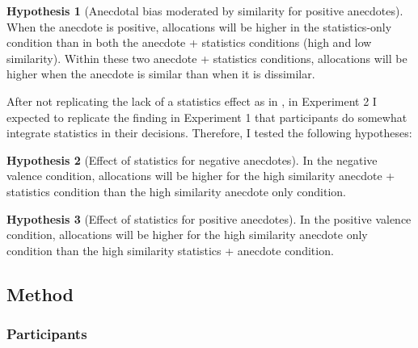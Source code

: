 \documentclass[a4paper, nobind, dvipsnames]{templates/ociamthesis}
\theoremstyle{definition}
\theoremstyle{definition}
\theoremstyle{definition}
\theoremstyle{definition}
\newtheorem{hypothesis}{Hypothesis}[chapter]
\theoremstyle{remark}
\begin{document}
\begin{hypothesis}[Anecdotal bias moderated by similarity for positive anecdotes]
\protect\hypertarget{hyp:anecdote-similarity-anecdotes-2}{}{\label{hyp:anecdote-similarity-anecdotes-2} {} }When the anecdote is positive, allocations will be higher in the statistics-only
condition than in both the anecdote + statistics conditions (high and low
similarity). Within these two anecdote + statistics conditions, allocations will
be higher when the anecdote is similar than when it is dissimilar.
\end{hypothesis}

After not replicating the lack of a statistics effect as in \textcite{wainberg2013}, in
Experiment 2 I expected to replicate the finding in Experiment 1 that
participants do somewhat integrate statistics in their decisions. Therefore, I
tested the following hypotheses:

\begin{hypothesis}[Effect of statistics for negative anecdotes]
\protect\hypertarget{hyp:statistics-negative-anecdotes-2}{}{\label{hyp:statistics-negative-anecdotes-2} {} }In the negative valence condition, allocations will be higher for the high
similarity anecdote + statistics condition than the high similarity
anecdote only condition.
\end{hypothesis}

\begin{hypothesis}[Effect of statistics for positive anecdotes]
\protect\hypertarget{hyp:statistics-positive-anecdotes-2}{}{\label{hyp:statistics-positive-anecdotes-2} {} }In the positive valence condition, allocations will be higher for the high
similarity anecdote only condition than the high similarity statistics +
anecdote condition.
\end{hypothesis}

\subsection{Method}

\subsubsection{Participants}
\end{document}
